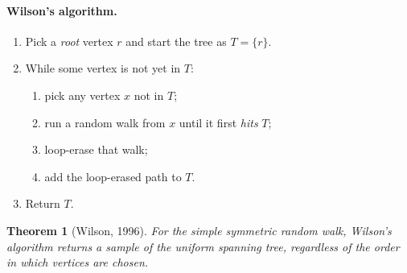 \documentclass[11pt]{article}
\theoremstyle{definition}
\theoremstyle{plain}
\newtheorem{theorem}{Theorem}[section]
\begin{document}
\paragraph{Wilson's algorithm.}
\begin{enumerate}[leftmargin=2em,itemsep=2pt]
  \item Pick a \emph{root} vertex $r$ and start the tree as $T=\{r\}$.
  \item While some vertex is not yet in $T$:
    \begin{enumerate}[label=(\alph*)]
       \item pick any vertex $x$ not in $T$;
       \item run a random walk from $x$ until it first \emph{hits} $T$;
       \item loop-erase that walk;
       \item add the loop-erased path to $T$.
    \end{enumerate}
  \item Return $T$.
\end{enumerate}

\begin{theorem}[Wilson, 1996]
For the simple symmetric random walk, Wilson's algorithm returns a sample of the
\emph{uniform} spanning tree, regardless of the order in which vertices are
chosen.
\end{theorem}
\end{document}

